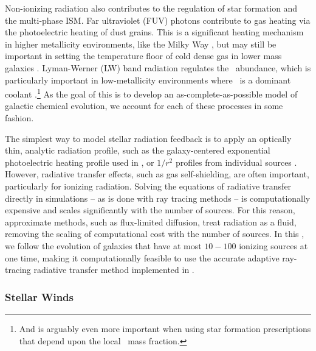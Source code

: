 Non-ionizing radiation also contributes to the regulation of star formation and the multi-phase ISM. Far ultraviolet (FUV) photons contribute to gas heating via the photoelectric heating of dust grains. This is a significant heating mechanism in higher metallicity environments, like the Milky Way \citep{Parravano2003,Wolfire2003}, but may still be important in setting the temperature floor of cold dense gas in lower mass galaxies \citep{Forbes2016,Hu2017}. Lyman-Werner (LW) band radiation regulates the \Hmolecular~abundance, which is particularly important in low-metallicity environments where \Hmolecular~is a dominant coolant \citep[e.g.][]{Glover2003,Wolcott-Green2012}.\footnote{And is arguably even more important when using star formation prescriptions that depend upon the local \Hmolecular~mass fraction.} As the goal of this \dissertation is to develop an as-complete-as-possible model of galactic chemical evolution, we account for each of these processes in some fashion.

The simplest way to model stellar radiation feedback is to apply an optically thin, analytic radiation profile, such as the galaxy-centered exponential photoelectric heating profile used in \cite{Tasker2009}, or $1/r^2$ profiles from individual sources \citep[e.g.][]{Forbes2016}. However, radiative transfer effects, such as gas self-shielding, are often important, particularly for ionizing radiation. Solving the equations of radiative transfer directly in simulations -- as is done with ray tracing methods -- is computationally expensive and scales significantly with the number of sources. For this reason, approximate methods, such as flux-limited diffusion, treat radiation as a fluid, removing the scaling of computational cost with the number of sources. In this \Dissertation, we follow the evolution of galaxies that have at most $10 - 100$ ionizing sources at one time, making it computationally feasible to use the accurate adaptive ray-tracing radiative transfer method implemented in .

\subsubsection{Stellar Winds}
\label{intro:sec:stellarwinds}

